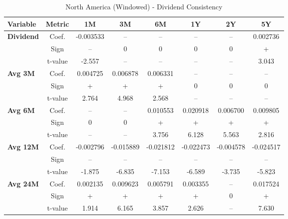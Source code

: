 \documentclass[11pt,english,a4paper,hidelinks]{book}
\begin{document}
\begin{table}[H]
    \centering
    \caption{North America (Windowed) - Dividend Consistency}
    \begin{tabular}{lccccccc}
        \toprule
        \textbf{Variable} & \textbf{Metric} & \textbf{1M} & \textbf{3M} & \textbf{6M} & \textbf{1Y} & \textbf{2Y} & \textbf{5Y} \\
        \midrule
        \multirow{3}{*}{\textbf{Dividend}}
            & Coef.   & -0.003533 & --        & --        & --        & --        & 0.002736 \\
            & Sign    & –         & 0         & 0         & 0         & 0         & +        \\
            & t-value & -2.557    & --        & --        & --        & --        & 3.043    \\
        \cmidrule{1-8}
        \multirow{3}{*}{\textbf{Avg 3M}}
            & Coef.   & 0.004725  & 0.006878  & 0.006331  & --        & --        & --       \\
            & Sign    & +         & +         & +         & 0         & 0         & 0        \\
            & t-value & 2.764     & 4.968     & 2.568     & --        & --        & --       \\
        \cmidrule{1-8}
        \multirow{3}{*}{\textbf{Avg 6M}}
            & Coef.   & --        & --        & 0.010553  & 0.020918  & 0.006700  & 0.009805 \\
            & Sign    & 0         & 0         & +         & +         & +         & +        \\
            & t-value & --        & --        & 3.756     & 6.128     & 5.563     & 2.816    \\
        \cmidrule{1-8}
        \multirow{3}{*}{\textbf{Avg 12M}}
            & Coef.   & -0.002796 & -0.015889 & -0.021812 & -0.022473 & -0.004578 & -0.024517 \\
            & Sign    & –         & –         & –         & –         & –         & –         \\
            & t-value & -1.875    & -6.835    & -7.153    & -6.589    & -3.735    & -5.823    \\
        \cmidrule{1-8}
        \multirow{3}{*}{\textbf{Avg 24M}}
            & Coef.   & 0.002135  & 0.009623  & 0.005791  & 0.003355  & --        & 0.017524 \\
            & Sign    & +         & +         & +         & +         & 0         & +        \\
            & t-value & 1.914     & 6.165     & 3.857     & 2.626     & --        & 7.630    \\
        \bottomrule
    \end{tabular}
    \label{tab:north_america_dividend_consistency}
\end{table}
\end{document}
